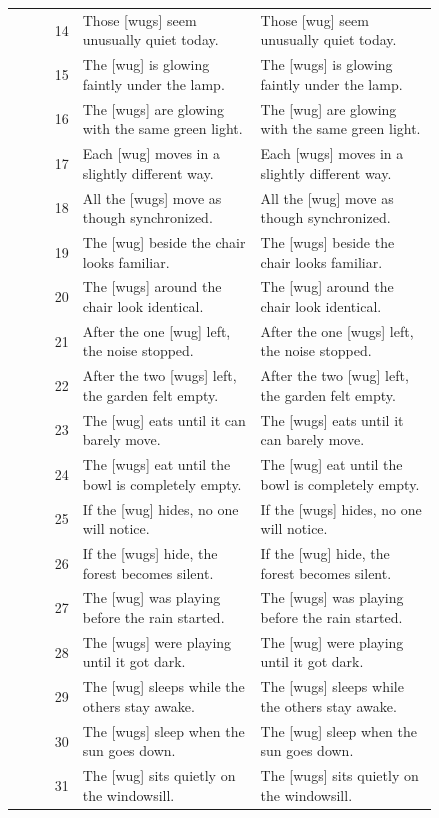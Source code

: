 \begin{longtable}{@{}rp{0.42\linewidth}p{0.42\linewidth}@{}}
14 & Those {[}wugs{]} seem unusually quiet today. & Those {[}wug{]} seem unusually quiet today. \\
15 & The {[}wug{]} is glowing faintly under the lamp. & The {[}wugs{]} is glowing faintly under the lamp. \\
16 & The {[}wugs{]} are glowing with the same green light. & The {[}wug{]} are glowing with the same green light. \\
17 & Each {[}wug{]} moves in a slightly different way. & Each {[}wugs{]} moves in a slightly different way. \\
18 & All the {[}wugs{]} move as though synchronized. & All the {[}wug{]} move as though synchronized. \\
19 & The {[}wug{]} beside the chair looks familiar. & The {[}wugs{]} beside the chair looks familiar. \\
20 & The {[}wugs{]} around the chair look identical. & The {[}wug{]} around the chair look identical. \\
21 & After the one {[}wug{]} left, the noise stopped. & After the one {[}wugs{]} left, the noise stopped. \\
22 & After the two {[}wugs{]} left, the garden felt empty. & After the two {[}wug{]} left, the garden felt empty. \\
23 & The {[}wug{]} eats until it can barely move. & The {[}wugs{]} eats until it can barely move. \\
24 & The {[}wugs{]} eat until the bowl is completely empty. & The {[}wug{]} eat until the bowl is completely empty. \\
25 & If the {[}wug{]} hides, no one will notice. & If the {[}wugs{]} hides, no one will notice. \\
26 & If the {[}wugs{]} hide, the forest becomes silent. & If the {[}wug{]} hide, the forest becomes silent. \\
27 & The {[}wug{]} was playing before the rain started. & The {[}wugs{]} was playing before the rain started. \\
28 & The {[}wugs{]} were playing until it got dark. & The {[}wug{]} were playing until it got dark. \\
29 & The {[}wug{]} sleeps while the others stay awake. & The {[}wugs{]} sleeps while the others stay awake. \\
30 & The {[}wugs{]} sleep when the sun goes down. & The {[}wug{]} sleep when the sun goes down. \\
31 & The {[}wug{]} sits quietly on the windowsill. & The {[}wugs{]} sits quietly on the windowsill. \\

\end{longtable}
